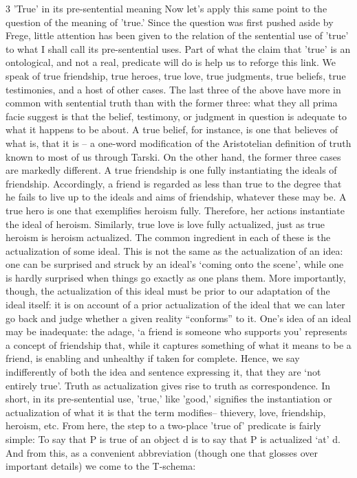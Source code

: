\documentclass[]{article}
\begin{document}
3 'True' in its pre-sentential meaning
Now let's apply this same point to the question of the meaning of 'true.' Since the question was first pushed aside by Frege,  little attention has been given to the relation of the sentential use of 'true' to what I shall call its pre-sentential uses. Part of what the claim that 'true' is an ontological, and not a real, predicate will do is help us to reforge this link.
We speak of true friendship, true heroes, true love, true judgments, true beliefs, true testimonies, and a host of other cases. The last three of the above have more in common with sentential truth than with the former three: what they all prima facie suggest is that the belief, testimony, or judgment in question is adequate to what it happens to be about. A true belief, for instance, is one that believes of what is, that it is – a one-word modification of the Aristotelian definition of truth known to most of us through Tarski.  On the other hand, the former three cases are markedly different.
A true friendship is one fully instantiating the ideals of friendship. Accordingly, a friend is regarded as less than true to the degree that he fails to live up to the ideals and aims of friendship, whatever these may be. A true hero is one that exemplifies heroism fully. Therefore, her actions instantiate the ideal of heroism. Similarly, true love is love fully actualized, just as true heroism is heroism actualized. 
The common ingredient in each of these is the actualization of some ideal. This is not the same as the actualization of an idea: one can be surprised and struck by an ideal's ‘coming onto the scene’, while one is hardly surprised when things go exactly as one plans them. 
More importantly, though, the actualization of this ideal must be prior to our adaptation of the ideal itself: it is on account of a prior actualization of the ideal that we can later go back and judge whether a given reality “conforms” to it. One’s idea of an ideal may be inadequate: the adage, ‘a friend is someone who supports you’ represents a concept of friendship that, while it captures something of what it means to be a friend, is enabling and unhealthy if taken for complete. Hence, we say indifferently of both the idea and sentence expressing it, that they are ‘not entirely true’. Truth as actualization gives rise to truth as correspondence.
In short, in its pre-sentential use, 'true,' like 'good,' signifies the instantiation or actualization of what it is that the term modifies– thievery, love, friendship, heroism, etc. 
From here, the step to a  two-place 'true of' predicate is fairly simple: To say that P is true of an object d is to say that P is actualized ‘at’ d.  And from this, as a convenient abbreviation (though one that glosses over important details) we come to the T-schema:
\end{document}
